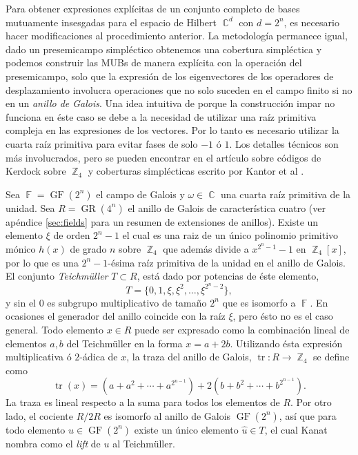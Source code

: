 \documentclass[a4paper]{report}
\DeclareMathOperator{\C}{\mathbb{C}}
\DeclareMathOperator{\Z}{\mathbb{Z}}
\DeclareMathOperator{\F}{\mathbb{F}}
\DeclareMathOperator{\tr}{tr}
\DeclareMathOperator{\GF}{GF}
\DeclareMathOperator{\GR}{GR}
\begin{document}
  Para obtener expresiones explícitas de un conjunto
  completo de bases mutuamente insesgadas para el espacio de
  Hilbert $\C^{d}$ con $d = 2^{n}$, es necesario hacer
  modificaciones al procedimiento anterior. La metodología
  permanece igual, dado un presemicampo simpléctico
  obtenemos una cobertura simpléctica y podemos construir
  las MUBs de manera explícita con la operación del
  presemicampo, solo que la expresión de los eigenvectores
  de los operadores de desplazamiento involucra operaciones
  que no solo suceden en el campo finito si no en un
  \textit{anillo de Galois}.  Una idea intuitiva de porque
  la construcción impar no funciona en éste caso se debe a
  la necesidad de utilizar una raíz primitiva compleja en
  las expresiones de los vectores. Por lo tanto es necesario
  utilizar la cuarta raíz primitiva para evitar fases de
  solo $-1$ ó $1$. Los detalles técnicos son más
  involucrados, pero se pueden encontrar en el artículo
  sobre códigos de Kerdock sobre $\Z_4$ y coberturas
  simplécticas escrito por Kantor et al \cite{kantor1982}.

  Sea $\F = \GF(2^{n})$ el campo de Galois y $\omega \in \C$
  una cuarta raíz primitiva de la unidad. Sea $R =
  \GR(4^{n})$ el anillo de Galois de característica cuatro
  (ver apéndice \ref{sec:fields} para un resumen de
  extensiones de anillos). Existe un elemento $\xi$ de orden
  $2^{n}-1$ el cual es una raiz de un único polinomio
  primitivo mónico $h(x)$ de grado $n$ sobre $\Z_4$ que
  además divide a $x^{2^{n}-1} - 1$ en $\Z_4[x]$, por lo que
  es una $2^{n}-1$-ésima raíz primitiva de la unidad en el
  anillo de Galois. El conjunto \textit{Teichmüller} $T
  \subset R$, está dado por potencias de éste elemento,
  \begin{equation}
    T = \{0,1,\xi,\xi^2,\ldots,\xi^{2^{n}-2}\},
  \end{equation}
  y sin el $0$ es subgrupo multiplicativo de tamaño $2^{n}$
  que es isomorfo a $\F$. En ocasiones el generador del
  anillo coincide con la raíz $\xi$, pero ésto no es el caso
  general. Todo elemento $x \in R$ puede ser expresado como
  la combinación lineal de elementos $a,b$ del Teichmüller
  en la forma $x = a + 2b$.  Utilizando ésta expresión
  multiplicativa ó $2$-ádica de $x$, la traza del anillo de
  Galois, $\tr : R \to \Z_4$ se define como
  \begin{equation}
    \tr(x)
    = \left(a + a^2 + \cdots + a^{2^{n-1}}\right) + 2\left(
    b + b^2 + \cdots + b^{2^{n-1}}\right).
  \end{equation}
  La traza es lineal respecto a la suma para todos los
  elementos de $R$. Por otro lado, el cociente $R / 2R$ es
  isomorfo al anillo de Galois $\GF(2^{n})$, así que para
  todo elemento $u \in \GF(2^{n})$ existe un único elemento
  $\hat u \in T$, el cual Kanat nombra como el \textit{lift}
  de $u$ al Teichmüller. 
\end{document}

